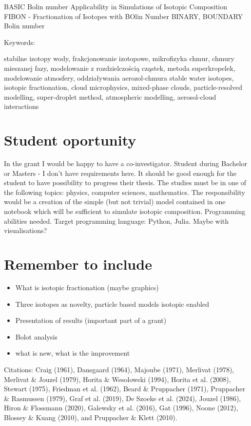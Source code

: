 \documentclass[11pt,a4paper]{article}
\begin{document}
BASIC
Bolin number Applicability in Simulations of Isotopic Composition
FIBON - Fractionation of Isotopes with BOlin Number
BINARY, BOUNDARY
Bolin number 

Keywords:

stabilne izotopy wody, frakcjonowanie izotopowe, mikrofizyka chmur, chmury mieszanej fazy, modelowanie z rozdzielczością cząstek, metoda superkropelek, modelowanie atmosfery, oddziaływania aerozol-chmura
stable water isotopes, isotopic fractionation, cloud microphysics, mixed-phase clouds, particle-resolved modelling, super-droplet method, atmospheric modelling, aerosol-cloud interactions



\section{Student oportunity}
In the grant I would be happy to have a co-investigator. 
Student during Bachelor or Masters - I don't have requirements here.
It should be good enough for the student to have possibility to progress their thesis.
The studies must be in one of the following topics: physics, computer sciences, mathematics.
The responsibility would be a creation of the simple (but not trivial) model contained in one notebook 
which will be sufficient to simulate isotopic composition.
Programming abilities needed.
Target programming language: Python, Julia. 
Maybe with visualisations? 


\section{Remember to include}
\begin{itemize}
    \item What is isotopic fractionation (maybe graphics)
    \item Three isotopes as novelty, particle based models isotopic enabled
    \item Presentation of results (important part of a grant)
    \item Bolot analysis
    \item what is new, what is the improvement
\end{itemize}

Citations:
Craig (1961), Dansgaard (1964), Majoube (1971), Merlivat (1978), Merlivat \& Jouzel (1979),
Horita \& Wesolowski (1994), Horita et al. (2008), Stewart (1975), Friedman et al. (1962),
Beard \& Pruppacher (1971), Pruppacher \& Rasmussen (1979), Graf et al. (2019),
De Szoeke et al. (2024), Jouzel (1986), Hiron \& Flossmann (2020), Galewsky et al. (2016),
Gat (1996), Noone (2012), Blossey \& Kuang (2010), and Pruppacher \& Klett (2010).
\end{document}
